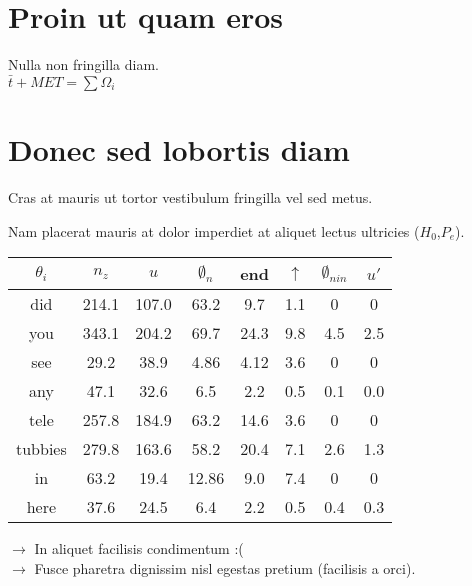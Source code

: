 
\printTitle

\printOutline

\section{Proin ut quam eros}

	\slideCentered
	{
		\bigskip
		Nulla non fringilla diam.\\
		$\bar{t}+MET = \sum \Omega_i$\\
	}

\section{Donec sed lobortis diam}

	\slide
	{
		\itemList
		{
			\item Cras at mauris ut tortor vestibulum fringilla vel sed metus.
			\item Nam placerat mauris at dolor imperdiet at aliquet lectus ultricies ($H_0$,$P_e$).
		}
		\centered
		{
	    \begin{tabular}{|c|ccccccc|}
			\hline
			  $\theta_i$ &  $n_{z}$  &  $u$   &   $\emptyset_n$    &   end   &  $\uparrow$    &   $\emptyset_{nin}$ & $u'$ \\
			\hline
			\hline
			 did  & 214.1  & 107.0  & 63.2  &  9.7    &  1.1   &  0   &  0  \\
			 you  & 343.1  & 204.2  & 69.7  &  24.3    &  9.8   &  4.5   &  2.5  \\
			\hline
			 see  &  29.2  &  38.9  & 4.86  &  4.12     &  3.6      &  0      &  0    \\
			 any  & 47.1  & 32.6  & 6.5  &  2.2    &  0.5   &  0.1   &  0.0  \\
			\hline
			\hline
			 tele  & 257.8  & 184.9  & 63.2  &  14.6    &  3.6   &  0    &  0  \\
			 tubbies  & 279.8  & 163.6  & 58.2  &  20.4    &  7.1    &  2.6    &  1.3  \\
			\hline
			 in  & 63.2   &  19.4  &  12.86     &  9.0      &  7.4      &  0      &  0    \\
			 here  & 37.6   &  24.5  &  6.4     &  2.2       &  0.5      &  0.4      &  0.3    \\
			\hline
		\end{tabular}
		}
		\bigskip
		$\rightarrow$ In aliquet facilisis condimentum :(\\
		$\rightarrow$ Fusce pharetra dignissim nisl egestas pretium (facilisis a orci).

	}

